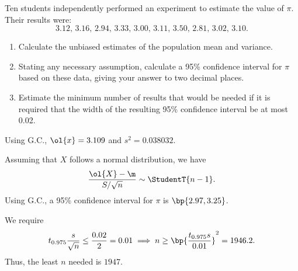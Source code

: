 \begin{problem}
    Ten students independently performed an experiment to estimate the value of $\pi$. Their results were: \[3.12, \, 3.16, \, 2.94, \, 3.33, \, 3.00, \, 3.11, \, 3.50, \, 2.81, \, 3.02, \, 3.10.\]
    
    \begin{enumerate}
        \item Calculate the unbiased estimates of the population mean and variance.
        \item Stating any necessary assumption, calculate a 95\% confidence interval for $\pi$ based on these data, giving your answer to two decimal places.
        \item Estimate the minimum number of results that would be needed if it is required that the width of the resulting 95\% confidence interval be at most 0.02.
    \end{enumerate}
\end{problem}
\begin{solution}
    \begin{ppart}
        Using G.C., $\ol{x} = 3.109$ and $s^2 = 0.038032$.
    \end{ppart}
    \begin{ppart}
        Assuming that $X$ follows a normal distribution, we have \[\frac{\ol{X} - \m}{S / \sqrt{n}} \sim \StudentT{n-1}.\] Using G.C., a 95\% confidence interval for $\pi$ is $\bp{2.97, 3.25}$.
    \end{ppart}
    \begin{ppart}
        We require \[t_{0.975} \frac{s}{\sqrt{n}} \leq \frac{0.02}{2} = 0.01 \implies n \geq \bp{\frac{t_{0.975} s}{0.01}}^2 = 1946.2.\] Thus, the least $n$ needed is $1947$.
    \end{ppart}
\end{solution}

